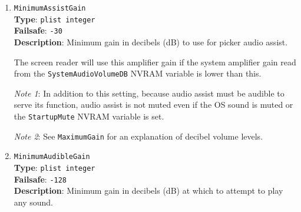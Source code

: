\documentclass[]{article}
\begin{document}
\begin{enumerate}
  All UEFI audio will use this gain setting when the system amplifier gain read from the \texttt{SystemAudioVolumeDB}
  NVRAM variable is higher than this. This is to avoid over-loud UEFI audio when the system volume is set very high,
  or the \texttt{SystemAudioVolumeDB} NVRAM value has been misconfigured.

  \emph{Note 1}: Decibels (dB) specify gain (postive values; increase in volume) or attenuation (negative values; decrease
  in volume) compared to some reference level. When you hear the sound level of a jet plane expressed as 120 decibels, say,
  the reference level is the sound level just audible to an average human. However generally
  in acoustic science and computer audio any reference level can be specified. Intel HDA and macOS natively use
  decibels to specify volume level. On most Intel HDA hardware the reference level of 0 dB is the
  \emph{loudest} volume of the hardware, and all lower volumes are therefore negative numbers. The quietest volume
  on typical sound hardware is around -55 dB to -60 dB.

  \emph{Note 2}: Matching how macOS handles decibel values, this value is converted to a signed byte; therefore values
  outside $-128$ dB to $+127$ dB (which are well beyond physically plausible volume levels) are not allowed.

  \emph{Note 3}: Digital audio output -- which does not have a volume slider in-OS -- ignores this and all other gain settings,
  only mute settings are relevant.

\item
  \texttt{MinimumAssistGain}\\
  \textbf{Type}: \texttt{plist\ integer}\\
  \textbf{Failsafe}: \texttt{-30}\\
  \textbf{Description}: Minimum gain in decibels (dB) to use for picker audio assist.

  The screen reader will use this amplifier gain if the system amplifier gain read from the \texttt{SystemAudioVolumeDB}
  NVRAM variable is lower than this.

  \emph{Note 1}: In addition to this setting, because audio assist must be audible to serve its function, audio assist
  is not muted even if the OS sound is muted or the \texttt{StartupMute} NVRAM variable is set.

  \emph{Note 2}: See \texttt{MaximumGain} for an explanation of decibel volume levels.

\item
  \texttt{MinimumAudibleGain}\\
  \textbf{Type}: \texttt{plist\ integer}\\
  \textbf{Failsafe}: \texttt{-128}\\
  \textbf{Description}: Minimum gain in decibels (dB) at which to attempt to play any sound.


\end{enumerate}
\end{document}

